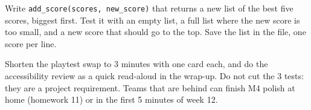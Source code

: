 \begin{stretchchallenge}
Write \texttt{add\_score(scores, new\_score)} that returns a new list of the best five scores,
biggest first. Test it with an empty list, a full list where the new score is too small, and a
new score that should go to the top. Save the list in the file, one score per line.
\end{stretchchallenge}

\begin{teachernote}
Shorten the playtest swap to 3 minutes with one card each, and do the accessibility review as a
quick read-aloud in the wrap-up. Do not cut the 3 tests: they are a project requirement. Teams
that are behind can finish M4 polish at home (homework 11) or in the first 5 minutes of week 12.
\end{teachernote}
